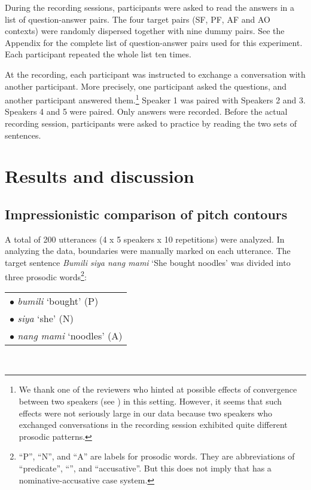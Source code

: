 \documentclass[output=paper]{langsci/langscibook}
\begin{document}
\noindent
During the recording sessions, participants were asked to read the answers in a list of question-answer pairs. The four target pairs (SF, PF, AF and AO contexts) were randomly dispersed together with nine dummy pairs. See the Appendix for the complete list of question-answer pairs used for this experiment. Each participant repeated the whole list ten times.

At the recording, each participant was instructed to exchange a conversation with another participant. More precisely, one participant asked the questions, and another participant answered them.\footnote{We thank one of the reviewers who hinted at possible effects of convergence between two speakers (see \citealt{Garrod2009, Kim2011, Gorisch2012}) in this setting. However, it seems that such effects were not seriously large in our data because two speakers who exchanged conversations in the recording session exhibited quite different prosodic patterns.}  Speaker 1 was paired with Speakers 2 and 3. Speakers 4 and 5 were paired. Only answers were recorded. Before the actual recording session, participants were asked to practice by reading the two sets of sentences.

\section{\label{s:nagaya:3}Results and discussion}
\subsection{\label{s:nagaya:3.1}Impressionistic comparison of pitch contours}

A total of 200 utterances (4  x 5 speakers x 10 repetitions) were analyzed. In analyzing the data,  boundaries were manually marked on each utterance. The target sentence \textit{Bumili siya nang mami} ‘She bought noodles’ was divided into three prosodic words\footnote{“P”, “N”, and “A” are labels for prosodic words. They are abbreviations of “predicate”, “”, and “accusative”. But this does not imply that  has a nominative-accusative case system.}:\\

\begin{tabular}{l}
$\bullet$ \textit{bumili} ‘bought’ (P)\\
$\bullet$ \textit{siya} ‘she’ (N)\\
$\bullet$ \textit{nang mami} ‘noodles’ (A)\\
\end{tabular}\\
\end{document}

